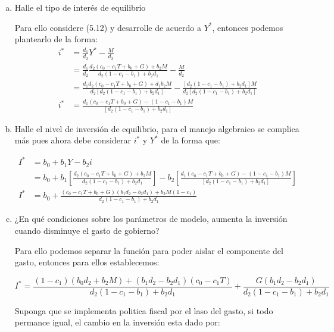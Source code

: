 \begin{enumerate}[(a)]
\item Halle el tipo de interés de equilibrio

Para ello considere (5.12) y desarrolle de acuerdo a $Y^{*}$, entonces podemos plantearlo de la forma:
\begin{align}
        i^{*} & = \frac{d_{1}}{d_{2}}Y^{*}-\frac{M}{d_{2}}\\
         & = \frac{d_{1}}{d_{2}}\frac{d_{2}(c_{0}-c_{1}T+ b_{0}+G) +b_{2}M}{d_{2}(1-c_{1}-b_{1})+b_{2}d_{1}}-\frac{M}{d_{2}} \\
          & = \frac{d_{1}d_{2}(c_{0}-c_{1}T+ b_{0}+G) +d_{1}b_{2}M}{d_{2}\left[d_{2}(1-c_{1}-b_{1})+b_{2}d_{1}\right]}-\frac{\left[d_{2}(1-c_{1}-b_{1})+b_{2}d_{1}\right]M}{d_{2}\left[d_{2}(1-c_{1}-b_{1})+b_{2}d_{1}\right]}\\
         i^{*} & = \frac{d_{1}(c_{0}-c_{1}T+ b_{0}+G)-(1-c_{1}-b_{1})M}{\left[d_{2}(1-c_{1}-b_{1})+b_{2}d_{1}\right]}
\end{align}

\item Halle el nivel de inversión de equilibrio, para el manejo algebraico se complica más pues ahora debe considerar $i^{*}$ y $Y^{*}$ de la forma que:

\begin{align*}
    I^{*} &= b_{0}+b_{1}Y -b_{2}i \\
    & = b_{0}+b_{1}\left[\frac{d_{2}(c_{0}-c_{1}T+ b_{0}+G) +b_{2}M}{d_{2}(1-c_{1}-b_{1})+b_{2}d_{1}}\right]-b_{2}\left[\frac{d_{1}(c_{0}-c_{1}T+ b_{0}+G)-(1-c_{1}-b_{1})M}{\left[d_{2}(1-c_{1}-b_{1})+b_{2}d_{1}\right]}\right] \\
   I^{*} & = b_{0}+\frac{(c_{0}-c_{1}T+ b_{0}+G)(b_{1}d_{2}-b_{2}d_{1})+b_{2}M(1-c_{1})
    }{d_{2}(1-c_{1}-b_{1})+b_{2}d_{1}} 
\end{align*}
\item ¿En qué condiciones sobre los parámetros de modelo, aumenta la inversión cuando disminuye el gasto de gobierno?

Para ello podemos separar la función para poder aislar el componente del gasto, entonces para ellos establecemos:

\begin{equation}
    I^{*} = \frac{(1-c_{1})(b_{0}d_{2}+b_{2}M)+(b_{1}d_{2}-b_{2}d_{1})(c_{0}-c_{1}T)}{d_{2}(1-c_{1}-b_{1})+b_{2}d_{1}}+\frac{G(b_{1}d_{2}-b_{2}d_{1})}{d_{2}(1-c_{1}-b_{1})+b_{2}d_{1}}
\end{equation}

Suponga que se implementa politica fiscal por el laso del gasto, si todo permance igual, el cambio en la inversión esta dado por:


\end{enumerate}
